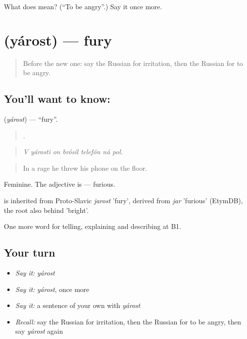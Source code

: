 \begin{tcolorbox}[breakable,colback=teal!4,colframe=teal!35!black,title={Before you move on}]
What does  mean? (\textquotedblleft{}To be angry\textquotedblright{}.) Say it once more.
\end{tcolorbox}
\section[\texorpdfstring{\ru{ярость} (yárost)}{ярость (yárost)}]{ (yárost) — fury}

\label{lesson:RU-C472-yarost}



\begin{quote}
Before the new one: say the Russian for irritation, then the Russian for to be angry.
\end{quote}

\subsection*{You'll want to know: }
\textbf{} (\emph{yárost}) — \textquotedblleft{}fury\textquotedblright{}.

\begin{quote}
      .
\end{quote}

\begin{quote}
\emph{V yárosti on brósil telefón ná pol.}
\end{quote}

\begin{quote}
In a rage he threw his phone on the floor.
\end{quote}

Feminine. The adjective is \emph{} — furious.

\begin{cousinweb}
\emph{} is inherited from Proto-Slavic \emph{jarost} 'fury', derived from \emph{jar} 'furious' (EtymDB), the root also behind \emph{} 'bright'.
\end{cousinweb}

\begin{grammarlens}[title={What you've built}]
One more word for telling, explaining and describing at B1.
\end{grammarlens}

\subsection*{Your turn}
\begin{itemize}
\raggedright
  \item \emph{Say it:} \emph{yárost}
  \item \emph{Say it:} \emph{yárost}, once more
  \item \emph{Say it:} a sentence of your own with \emph{yárost}
  \item \emph{Recall:} say the Russian for irritation, then the Russian for to be angry, then say \emph{yárost} again
\end{itemize}

